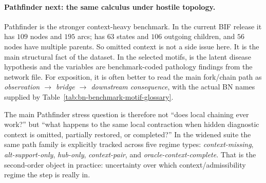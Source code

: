 \documentclass[11pt,openany]{report}
\begin{document}
\paragraph{Pathfinder next: the same calculus under hostile topology.}
Pathfinder is the stronger context-heavy benchmark.  In the current BIF
release it has $109$ nodes and $195$ arcs;  has $63$ states
and $106$ outgoing children, and $56$ nodes have multiple parents.  So
omitted context is not a side issue here.  It is the main structural
fact of the dataset.  In the selected motifs,  is the latent
disease hypothesis and the  variables are benchmark-coded
pathology findings from the network file.  For exposition, it is often
better to read the main fork/chain path as
\textit{observation $\rightarrow$ bridge $\rightarrow$ downstream
consequence}, with the actual BN names supplied by
Table~\ref{tab:bn-benchmark-motif-glossary}.
\par
The main Pathfinder stress question is therefore not ``does local
chaining ever work?'' but ``what happens to the same local contraction
when hidden diagnostic context is omitted, partially restored, or
completed?''  In the widened suite the same path family is explicitly
tracked across five regime types:
\emph{context-missing}, \emph{alt-support-only}, \emph{hub-only},
\emph{context-pair}, and \emph{oracle-context-complete}.  That is the
second-order object in practice: uncertainty over which
context/admissibility regime the step is really in.
\par
\end{document}
